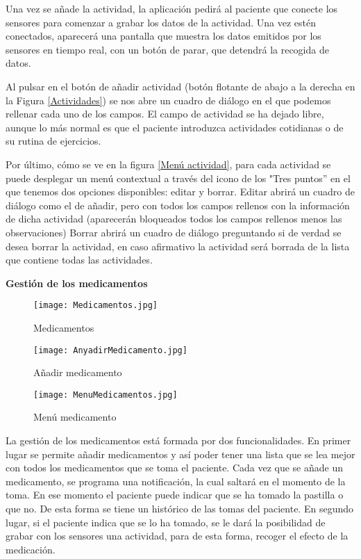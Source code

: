 \documentclass[11pt,spanish]{article}
\begin{document}
Una vez se añade la actividad, la aplicación pedirá al paciente que conecte los sensores para comenzar a grabar los datos de la actividad. Una vez estén conectados, aparecerá una pantalla que muestra los datos emitidos por los sensores en tiempo real, con un botón de parar, que detendrá la recogida de datos.
\newline

Al pulsar en el botón de añadir actividad (botón flotante de abajo a la derecha en la Figura \ref{Actividades}) se nos abre un cuadro de diálogo en el que podemos rellenar cada uno de los campos. El campo de actividad se ha dejado libre, aunque lo más normal es que el paciente introduzca actividades cotidianas o de su rutina de ejercicios.
\newline

Por último, cómo se ve en la figura \ref{Menú actividad}, para cada actividad se puede desplegar un menú contextual a través del icono de los "Tres puntos'' en el que tenemos dos opciones disponibles: editar y borrar. Editar abrirá un cuadro de diálogo como el de añadir, pero con todos los campos rellenos con la información de dicha actividad (aparecerán bloqueados todos los campos rellenos menos las observaciones) Borrar abrirá un cuadro de diálogo preguntando si de verdad se desea borrar la actividad, en caso afirmativo la actividad será borrada de la lista que contiene todas las actividades.
\newline

{\bf Gestión de los medicamentos}
\newline
\newline

\begin{figure}[!htb]
  \texttt{[image: Medicamentos.jpg]}
  \caption{Medicamentos}
  \label{Medicamentos}
\endminipage\hfill
{}
  \texttt{[image: AnyadirMedicamento.jpg]}
  \caption{Añadir medicamento}
  \label{Añadir medicamento}
\endminipage\hfill
{}%
  \texttt{[image: MenuMedicamentos.jpg]}
  \caption{Menú medicamento}
  \label{Menú medicamento}
\endminipage
\end{figure}

La gestión de los medicamentos está formada por dos funcionalidades. En primer lugar se permite añadir medicamentos y así poder tener una lista que se lea mejor con todos los medicamentos que se toma el paciente. Cada vez que se añade un medicamento, se programa una notificación, la cual saltará en el momento de la toma. En ese momento el paciente puede indicar que se ha tomado la pastilla o que no. De esta forma se tiene un histórico de las tomas del paciente. En segundo lugar, si el paciente indica que se lo ha tomado, se le dará la posibilidad de grabar con los sensores una actividad, para de esta forma, recoger el efecto de la medicación.
\newline
\end{document}
